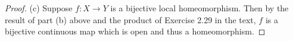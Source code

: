 \documentclass{article}
\theoremstyle{definition}
\begin{document}
\begin{proof}



(c) Suppose $f : X \to Y$ is a bijective local homeomorphism.
Then by the result of part (b) above and the product of Exercise 2.29 in the
text, $f$ is a bijective continuous map which is open and thus a homeomorphism.
\end{proof}
\end{document}
